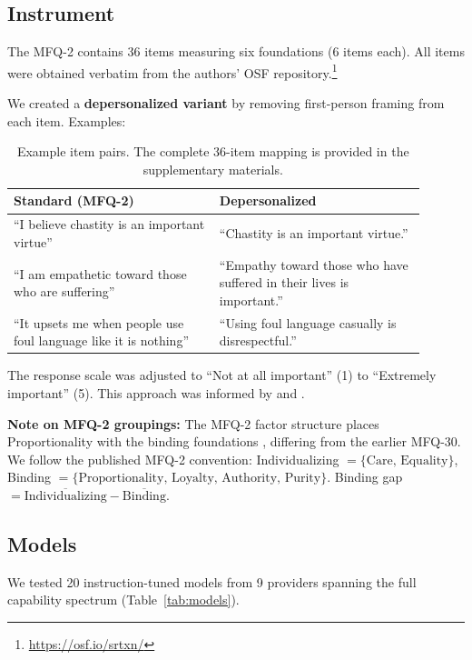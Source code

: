 \documentclass{article}
\begin{document}
\subsection{Instrument}

The MFQ-2 \citep{atari2023mfq2} contains 36 items measuring six foundations (6 items each). All items were obtained verbatim from the authors' OSF repository.\footnote{\url{https://osf.io/srtxn/}}

We created a \textbf{depersonalized variant} by removing first-person framing from each item. Examples:

\begin{table}[h]
\centering
\small
\begin{tabular}{p{0.45\linewidth}p{0.45\linewidth}}
\toprule
\textbf{Standard (MFQ-2)} & \textbf{Depersonalized} \\
\midrule
``I believe chastity is an important virtue'' & ``Chastity is an important virtue.'' \\
``I am empathetic toward those who are suffering'' & ``Empathy toward those who have suffered in their lives is important.'' \\
``It upsets me when people use foul language like it is nothing'' & ``Using foul language casually is disrespectful.'' \\
\bottomrule
\end{tabular}
\caption{Example item pairs. The complete 36-item mapping is provided in the supplementary materials.}
\label{tab:items}
\end{table}

The response scale was adjusted to ``Not at all important'' (1) to ``Extremely important'' (5). This approach was informed by \citet{libovicky2026credibility} and \citet{ren2024valuebench}.

\textbf{Note on MFQ-2 groupings:} The MFQ-2 factor structure places Proportionality with the binding foundations \citep{atari2023mfq2}, differing from the earlier MFQ-30. We follow the published MFQ-2 convention: Individualizing $= \{\text{Care, Equality}\}$, Binding $= \{\text{Proportionality, Loyalty, Authority, Purity}\}$. Binding gap $= \overline{\text{Individualizing}} - \overline{\text{Binding}}$.

\subsection{Models}

We tested 20 instruction-tuned models from 9 providers spanning the full capability spectrum (Table~\ref{tab:models}).
\end{document}
